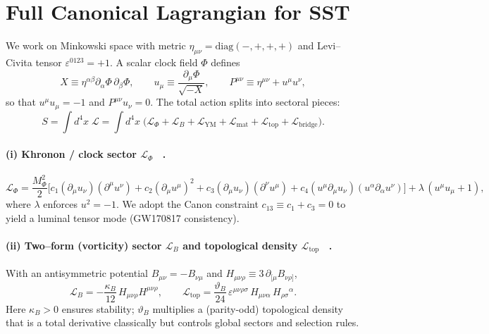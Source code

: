 \documentclass[10pt,reprint,aps,onecolumn,nofootinbib]{revtex4-2}
\begin{document}
\section{Full Canonical Lagrangian for SST}
    \label{app:fullL}

    We work on Minkowski space with metric \(\eta_{\mu\nu}=\mathrm{diag}(-,+,+,+)\) and Levi–Civita tensor \(\varepsilon^{0123}=+1\).
    A scalar clock field \(\Phi\) defines
    \[
        X \equiv \eta^{\alpha\beta}\partial_\alpha\Phi\,\partial_\beta\Phi,\qquad
        u_\mu \equiv \frac{\partial_\mu\Phi}{\sqrt{-X}},\qquad
        P^{\mu\nu} \equiv \eta^{\mu\nu}+u^\mu u^\nu,
    \]
    so that \(u^\mu u_\mu=-1\) and \(P^{\mu\nu}u_\nu=0\).
    The total action splits into sectoral pieces:
    \begin{equation}
    S=\int d^4x\;\mathcal{L}
    =\int d^4x\;\Big(
    \mathcal{L}_\Phi
    +\mathcal{L}_B
    +\mathcal{L}_{\mathrm{YM}}
    +\mathcal{L}_{\mathrm{mat}}
    +\mathcal{L}_{\mathrm{top}}
    +\mathcal{L}_{\mathrm{bridge}}
    \Big).
    \label{eq:S_total_app}
    \end{equation}

    \paragraph*{(i) Khronon / clock sector \(\mathcal{L}_\Phi\)~ \cite{sstLagrangian}.}
        \begin{equation}
        \mathcal{L}_\Phi
        =\frac{M_\Phi^2}{2}\Big[
            c_1(\partial_\mu u_\nu)(\partial^\mu u^\nu)
            +c_2(\partial_\mu u^\mu)^2
            +c_3(\partial_\mu u_\nu)(\partial^\nu u^\mu)
            +c_4(u^\mu\partial_\mu u_\nu)(u^\alpha\partial_\alpha u^\nu)
            \Big]
        +\lambda\,(u^\mu u_\mu+1),
        \label{eq:Lphi_app}
        \end{equation}
        where \(\lambda\) enforces \(u^2=-1\). We adopt the Canon constraint \(c_{13}\equiv c_1+c_3=0\) to yield a luminal tensor mode (GW170817 consistency).

    \paragraph*{(ii) Two–form (vorticity) sector \(\mathcal{L}_B\) and topological density \(\mathcal{L}_{\mathrm{top}}\)~ \cite{sstLagrangian}.}
        With an antisymmetric potential \(B_{\mu\nu}=-B_{\nu\mu}\) and \(H_{\mu\nu\rho}\equiv 3\,\partial_{[\mu}B_{\nu\rho]}\),
        \begin{equation}
        \mathcal{L}_B
        =-\frac{\kappa_B}{12}\,H_{\mu\nu\rho}H^{\mu\nu\rho},
        \qquad
        \mathcal{L}_{\mathrm{top}}
        =\frac{\vartheta_B}{24}\,
        \varepsilon^{\mu\nu\rho\sigma}\,
        H_{\mu\nu\alpha}\,H_{\rho\sigma}{}^{\alpha}.
        \label{eq:LB_app}
        \end{equation}
        Here \(\kappa_B>0\) ensures stability; \(\vartheta_B\) multiplies a (parity-odd) topological density that is a total derivative classically but controls global sectors and selection rules.
\end{document}
